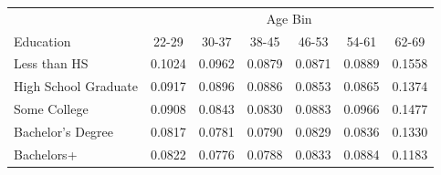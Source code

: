 \begin{tabular}{lcccccc}
\hline\hline
 & \multicolumn{6}{c}{Age Bin} \\
Education & 22-29 & 30-37 & 38-45 & 46-53 & 54-61 & 62-69 \\
\hline
Less than HS&0.1024&0.0962&0.0879&0.0871&0.0889&0.1558\\
High School Graduate&0.0917&0.0896&0.0886&0.0853&0.0865&0.1374\\
Some College&0.0908&0.0843&0.0830&0.0883&0.0966&0.1477\\
Bachelor's Degree&0.0817&0.0781&0.0790&0.0829&0.0836&0.1330\\
Bachelors+&0.0822&0.0776&0.0788&0.0833&0.0884&0.1183\\
\hline\hline
\end{tabular}
